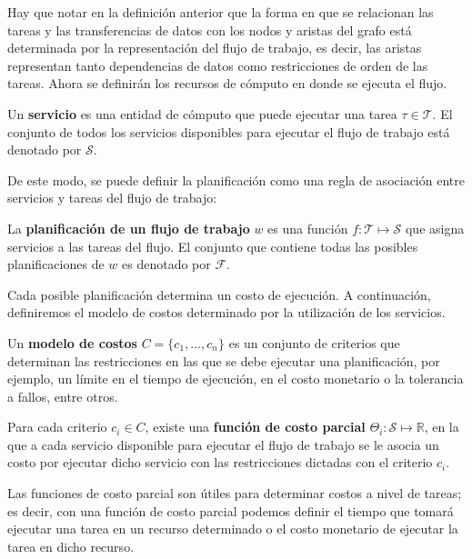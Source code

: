 \noindent Hay que notar en la definición anterior que la forma en que se relacionan las tareas y las transferencias de datos con los nodos y aristas del grafo está determinada por la representación del flujo de trabajo, es decir, las aristas representan tanto dependencias de datos como restricciones de orden de las tareas. Ahora se definirán los recursos de cómputo en donde se ejecuta el flujo.

\begin{defn}
Un \textbf{servicio} es una entidad de cómputo que puede ejecutar una tarea $\tau \in \mathcal{T}$. El conjunto de todos los servicios disponibles para ejecutar el flujo de trabajo está denotado por $\mathcal{S}$.
\end{defn}

\noindent De este modo, se puede definir la planificación como una regla de asociación entre servicios y tareas del flujo de trabajo:

\begin{defn}
La \textbf{planificación de un flujo de trabajo} $w$ es una función $ f: \mathcal{T} \mapsto \mathcal{S}$ que asigna servicios a las tareas del flujo. El conjunto que contiene todas las posibles planificaciones de $w$ es denotado por $\mathcal{F}$.
\end{defn}

\noindent Cada posible planificación determina un costo de ejecución. A continuación, definiremos el modelo de costos determinado por la utilización de los servicios.

\begin{defn}
Un \textbf{modelo de costos} $C = \{c_1, \dots, c_n\}$ es un conjunto de criterios que determinan las restricciones en las que se debe ejecutar una planificación, por ejemplo, un límite en el tiempo de ejecución, en el costo monetario o la tolerancia a fallos, entre otros.
\end{defn}

\begin{defn}
Para cada criterio $c_i \in C$, existe una \textbf{función de costo parcial} $\Theta_i : \mathcal{S} \mapsto \mathbb{R}$, en la que a cada servicio disponible para ejecutar el flujo de trabajo se le asocia un costo por ejecutar dicho servicio con las restricciones dictadas con el criterio $c_i$.
\end{defn}

\noindent Las funciones de costo parcial son útiles para determinar costos a nivel de tareas; es decir, con una función de costo parcial podemos definir el tiempo que tomará ejecutar una tarea en un recurso determinado o el costo monetario de ejecutar la tarea en dicho recurso.

